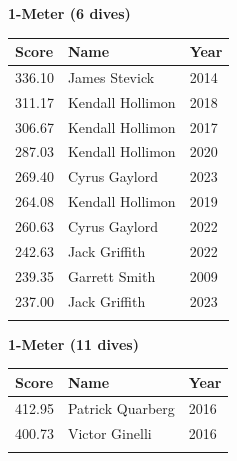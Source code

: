 \vspace{1.2em}
\noindent\begin{minipage}[t]{0.48\textwidth}
\centering
\textbf{\textcolor{teamprimary}{1-Meter (6 dives)}}\par
\vspace{0.5em}
\centering
\small
\renewcommand{\arraystretch}{1.0}
\setlength{\tabcolsep}{4pt}
\begin{tabular}{@{}p{1.8cm}p{3.0cm}p{1.0cm}@{}}
\toprule
\textbf{Score} & \textbf{Name} & \textbf{Year} \\
\midrule
336.10 & James Stevick & 2014 \\
311.17 & Kendall Hollimon & 2018 \\
306.67 & Kendall Hollimon & 2017 \\
287.03 & Kendall Hollimon & 2020 \\
269.40 & Cyrus Gaylord & 2023 \\
264.08 & Kendall Hollimon & 2019 \\
260.63 & Cyrus Gaylord & 2022 \\
242.63 & Jack Griffith & 2022 \\
239.35 & Garrett Smith & 2009 \\
237.00 & Jack Griffith & 2023 \\
\bottomrule
\vspace{0.5em}
\end{tabular}
\end{minipage}
\hfill
\begin{minipage}[t]{0.48\textwidth}
\centering
\textbf{\textcolor{teamprimary}{1-Meter (11 dives)}}\par
\vspace{0.5em}
\centering
\small
\renewcommand{\arraystretch}{1.0}
\setlength{\tabcolsep}{4pt}
\begin{tabular}{@{}p{1.8cm}p{3.0cm}p{1.0cm}@{}}
\toprule
\textbf{Score} & \textbf{Name} & \textbf{Year} \\
\midrule
412.95 & Patrick Quarberg & 2016 \\
400.73 & Victor Ginelli & 2016 \\
\bottomrule
\vspace{0.5em}
\end{tabular}
\end{minipage}
\vspace{1.2em}
